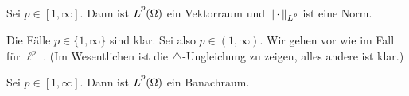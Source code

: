 \begin{thSatz}
    Sei $p\in[1,\infty]$. Dann ist $\Lpp(\Omega)$ ein Vektorraum und
    $\emptyNorm_{\Lpp}$ ist eine Norm.
\end{thSatz}

\begin{proofsketch}
    Die Fälle $p\in\{1,\infty\}$ sind klar. Sei also $p\in(1,\infty)$. Wir gehen
    vor wie im Fall für $\ell^p$ .
    (Im Wesentlichen ist die $\triangle$-Ungleichung zu zeigen, alles andere ist
    klar.)
    \\
\end{proofsketch}

\begin{thSatz}
    Sei $p\in[1,\infty]$. Dann ist $\Lpp(\Omega)$ ein Banachraum.
\end{thSatz}

